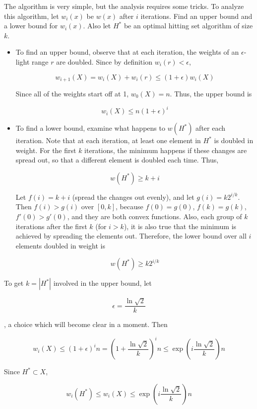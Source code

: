 \documentclass[11pt]{article}
\begin{document}
The algorithm is very simple, but the analysis requires some tricks.  To analyze this algorithm, let $w_i(x)$ be $w(x)$ after $i$ iterations.  Find an upper bound and a lower bound for $w_i(x)$.  Also let $H^*$ be an optimal hitting set algorithm of size $k$.

\begin{itemize}

\item To find an upper bound, observe that at each iteration, the weights of an $\epsilon$-light range $r$ are doubled.  Since by definition $w_i(r) < \epsilon$, 

\[ w_{i+1}(X) = w_i(X) + w_i(r) \leq (1 + \epsilon) w_i(X) \]

Since all of the weights start off at 1, $w_0(X) = n$.  Thus, the upper bound is 

\[ w_{i}(X) \leq n(1+\epsilon)^i \]


\item 
To find a lower bound, examine what happens to $w(H^*)$ after each iteration.  Note that at each iteration, at least one element in $H^*$ is doubled in weight.  For the first $k$ iterations, the minimum happens if these changes are spread out, so that a different element is doubled each time.  Thus,

\[ w(H^*) \geq k + i \]

Let $f(i) = k + i$ (spread the changes out evenly), and let $g(i) = k2^{i/k}$.  Then $f(i) > g(i)$ over $[0, k]$, because $f(0) = g(0)$, $f(k) = g(k)$, $f'(0) > g'(0)$, and they are both convex functions.  Also, each group of $k$ iterations after the first $k$ (for $i > k$), it is also true that the minimum is achieved by spreading the elements out.  Therefore, the lower bound over all $i$ elements doubled in weight is

\[ w(H^*) \geq k 2^{i/k} \]

\end{itemize}

To get $k = |H^*|$ involved in the upper bound, let

\[ \epsilon = \frac{\ln \sqrt{2}}{k} \]

, a choice which will become clear in a moment.  Then

\[ w_i(X) \leq (1 + \epsilon)^i n = \left(1 + \frac{\ln \sqrt{2}}{k} \right)^i n \leq  \exp\left(  i \frac{\ln \sqrt{2}}{k} \right) n\]

Since $H^* \subset X$,

\[ w_i(H^*) \leq w_i(X) \leq \exp\left(  i \frac{\ln \sqrt{2}}{k} \right) n \]
\end{document}
